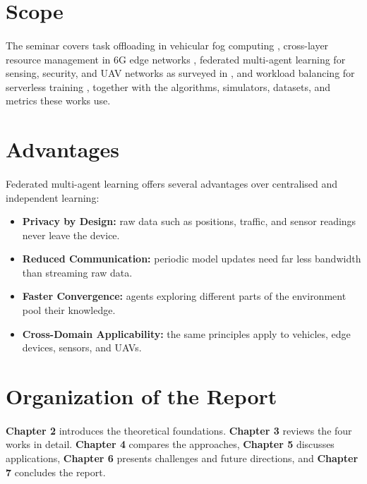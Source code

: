 \documentclass[12pt,a4paper,final]{extreport}
\begin{document}
\section{Scope}

\paragraph{} The seminar covers task offloading in vehicular fog computing \cite{p1}, cross-layer resource management in 6G edge networks \cite{p2}, federated multi-agent learning for sensing, security, and UAV networks as surveyed in \cite{p3}, and workload balancing for serverless training \cite{p4}, together with the algorithms, simulators, datasets, and metrics these works use.

\section{Advantages}

\paragraph{} Federated multi-agent learning offers several advantages over centralised and independent learning:
\begin{itemize}
  \item \textbf{Privacy by Design:} raw data such as positions, traffic, and sensor readings never leave the device.
  \item \textbf{Reduced Communication:} periodic model updates need far less bandwidth than streaming raw data.
  \item \textbf{Faster Convergence:} agents exploring different parts of the environment pool their knowledge.
  \item \textbf{Cross-Domain Applicability:} the same principles apply to vehicles, edge devices, sensors, and UAVs.
\end{itemize}

\section{Organization of the Report}

\paragraph{} \textbf{Chapter 2} introduces the theoretical foundations. \textbf{Chapter 3} reviews the four works in detail. \textbf{Chapter 4} compares the approaches, \textbf{Chapter 5} discusses applications, \textbf{Chapter 6} presents challenges and future directions, and \textbf{Chapter 7} concludes the report.
\end{document}
